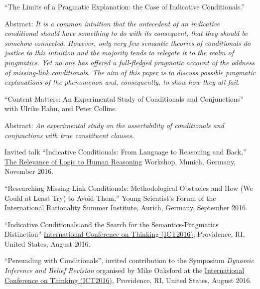 \documentclass[11pt,article,oneside]{memoir}
\begin{document}
\begin{itemize}
\ind ``The Limits of a Pragmatic Explanation: the Case of Indicative Conditionals.''

\ind \hspace{0.35in} \footnotesize 
Abstract: \textit{It is a common intuition that the antecedent of an indicative conditional should have something to do with its consequent, that they should be somehow connected. However, only very few semantic theories of conditionals do justice to this intuition and the majority tends to relegate it to the realm of pragmatics. Yet no one has offered a full-fledged pragmatic account of the oddness of missing-link conditionals. The aim of this paper is to discuss possible pragmatic explanations of the phenomenon and, consequently, to show how they all fail.}
\normalsize 
\vspace{0.05in}



\ind ``Content Matters: An Experimental Study of Conditionals and Conjunctions'' with Ulrike Hahn, and Peter Collins.

\ind \hspace{0.35in} \footnotesize 
Abstract: \textit{An experimental study on the assertability of conditionals and conjunctions with true constituent clauses.}
\normalsize 
\vspace{0.05in}



\bigskip 

\medskip
    \ind Invited talk ``Indicative Conditionals: From Language to Reasoning and Back,'' \href{http://www.mcmp.philosophie.uni-muenchen.de/events/workshops/container/relevance_of_logic/index.html}{The Relevance of Logic to Human Reasoning} Workshop, Munich, Germany, November 2016. 

  	\ind ``Researching Missing-Link Conditionals: Methodological Obstacles and How (We Could at Least Try) to Avoid Them,'' Young Scientist's Forum of the \href{https://irsi2016.de}{International Rationality Summer Institute}, Aurich, Germany, September 2016. 

    \ind ``Indicative Conditionals and the Search for the Semantics-Pragmatics Distinction'' \href{http://sites.clps.brown.edu/ict2016/}{International Conference on Thinking (ICT2016)}, Providence, RI, United States, August 2016.   

	\ind ``Persuading with Conditionals'', invited contribution to the Symposium \emph{Dynamic Inference and Belief Revision}  organised by Mike Oaksford at the \href{http://sites.clps.brown.edu/ict2016/}{International Conference on Thinking (ICT2016)}, Providence, RI, United States, August 2016.


\end{itemize}
\end{document}
